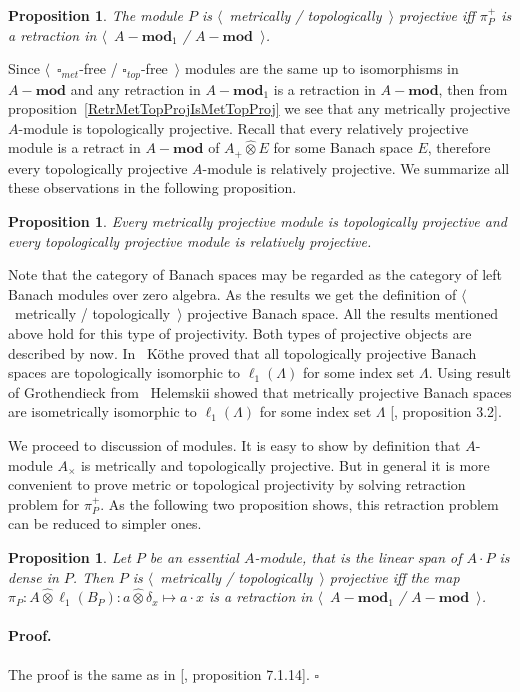 \documentclass[12pt]{article}
\newcommand{\projtens}{\mathbin{\widehat{\otimes}}}
\newtheorem{proposition}[theorem]{Proposition}
\renewenvironment{proof}{\paragraph{Proof.}}{\hfill$\square$\medskip}
\begin{document}
\begin{proposition}\label{MetTopProjModViaCanonicMorph} The module $P$ is
    $\langle$~metrically / topologically~$\rangle$ projective iff $\pi_P^+$ is a
    retraction in $\langle$~$A-\mathbf{mod}_1$ / $A-\mathbf{mod}$~$\rangle$.
\end{proposition}

Since $\langle$~$\square_{met}$-free / $\square_{top}$-free~$\rangle$ modules
are the same up to isomorphisms in $A-\mathbf{mod}$ and any retraction in $A-\mathbf{mod}_1$ is
a retraction in $A-\mathbf{mod}$, then from proposition~\ref{RetrMetTopProjIsMetTopProj}
we see that any metrically projective $A$-module is topologically projective.
Recall that every relatively projective module is a retract in $A-\mathbf{mod}$ of
$A_+\projtens E$ for some Banach space $E$, therefore every topologically
projective $A$-module is relatively projective. We summarize all these
observations in the following proposition.

\begin{proposition}\label{MetProjIsTopProjAndTopProjIsRelProj} Every metrically
    projective module is topologically projective and every topologically
    projective module is relatively projective.
\end{proposition}

Note that the category of Banach spaces may be regarded as the category of left
Banach modules over zero algebra. As the results we get the definition of
$\langle$~metrically / topologically~$\rangle$ projective Banach space. All the
results mentioned above hold for this type of projectivity. Both types of
projective objects are described by now. In~\cite{KotheTopProjBanSp} K{\"o}the
proved that all topologically projective Banach spaces are topologically
isomorphic to $\ell_1(\Lambda)$ for some index set $\Lambda$. Using result of
Grothendieck from~\cite{GrothMetrProjFlatBanSp} Helemskii showed that metrically
projective Banach spaces are isometrically isomorphic to $\ell_1(\Lambda)$ for
some index set $\Lambda$ [\cite{HelMetrFrQMod}, proposition 3.2].

We proceed to discussion of modules. It is easy to show by definition that
$A$-module $A_\times$ is metrically and topologically projective. But in general
it is more convenient to prove metric or topological projectivity by solving
retraction problem for $\pi_P^+$. As the following two proposition shows, this
retraction problem can be reduced to simpler ones.

\begin{proposition}\label{NonDegenMetTopProjCharac}  Let $P$ be an essential
    $A$-module, that is the linear span of $A\cdot P$ is dense in $P$. Then $P$
    is $\langle$~metrically / topologically~$\rangle$ projective iff the map
    $\pi_P:A\projtens\ell_1(B_P):a\projtens\delta_x\mapsto a\cdot x$ is a
    retraction in $\langle$~$A-\mathbf{mod}_1$ / $A-\mathbf{mod}$~$\rangle$.
\end{proposition}
\begin{proof} The proof is the same as in [\cite{HelBanLocConvAlg}, proposition
            7.1.14].
\end{proof}
\end{document}

